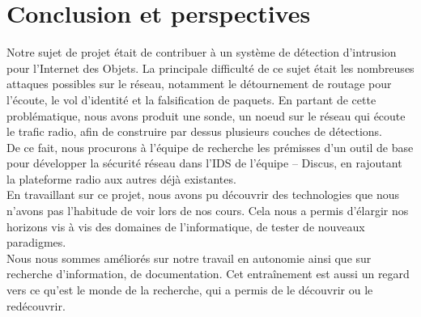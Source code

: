 \chapter*{Conclusion et perspectives}
\label{sec:conclusion}

    Notre sujet de projet était de contribuer à un système de détection d'intrusion pour l'Internet des Objets.
    La principale difficulté de ce sujet était les nombreuses attaques possibles sur le réseau, notamment le détournement de routage pour l'écoute, le vol d'identité et la falsification de paquets. En partant de cette problématique, nous avons produit une sonde, un noeud sur le réseau qui écoute le trafic radio, afin de construire par dessus plusieurs couches de détections.\\
    De ce fait, nous procurons à l'équipe de recherche les prémisses d'un outil de base pour développer la sécurité réseau dans l'IDS de l'équipe -- Discus, en rajoutant la plateforme radio aux autres déjà existantes.\\

	En travaillant sur ce projet, nous avons pu découvrir des technologies que nous n'avons pas l'habitude de voir lors de nos cours. Cela nous a permis d'élargir nos horizons vis à vis des domaines de l'informatique, de tester de nouveaux paradigmes.\\
	Nous nous sommes améliorés sur notre travail en autonomie ainsi que sur recherche d'information, de documentation. Cet entraînement est aussi un regard vers ce qu'est le monde de la recherche, qui a permis de le découvrir ou le redécouvrir.
	


